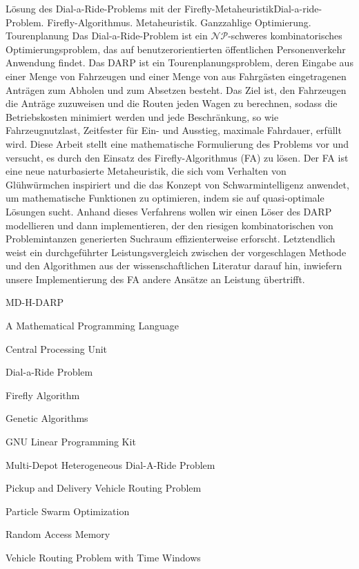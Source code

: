 \documentclass[tuberlin,cic,tc,openright,english,noabntcite,oneside]{iiufrgs}
\begin{document}
\begin{englishabstract}{Lösung des Dial-a-Ride-Problems mit der Firefly-Metaheuristik}{Dial-a-ride-Problem. Firefly-Algorithmus. Metaheuristik. Ganzzahlige Optimierung. Tourenplanung}
Das Dial-a-Ride-Problem ist ein $\mathcal{NP}$-schweres kombinatorisches Optimierungsproblem, das auf benutzerorientierten öffentlichen Personenverkehr Anwendung findet. Das DARP ist ein Tourenplanungsproblem, deren Eingabe aus einer Menge von Fahrzeugen und einer Menge von aus Fahrgästen eingetragenen Anträgen zum Abholen und zum Absetzen besteht. Das Ziel ist, den Fahrzeugen die Anträge zuzuweisen und die Routen jeden Wagen zu berechnen, sodass die Betriebskosten minimiert werden und jede Beschränkung, so wie Fahrzeugnutzlast, Zeitfester für Ein- und Ausstieg, maximale Fahrdauer, erfüllt wird. Diese Arbeit stellt eine mathematische Formulierung des Problems vor und versucht, es durch den Einsatz des Firefly-Algorithmus (FA) zu lösen. Der FA ist eine neue naturbasierte Metaheuristik, die sich vom Verhalten von Glühwürmchen inspiriert und die das Konzept von Schwarmintelligenz anwendet, um mathematische Funktionen zu optimieren, indem sie auf quasi-optimale Lösungen sucht. Anhand dieses Verfahrens wollen wir einen Löser des DARP modellieren und dann implementieren, der den riesigen kombinatorischen von Problemintanzen generierten Suchraum effizienterweise erforscht. Letztendlich weist ein durchgeführter Leistungsvergleich zwischen der vorgeschlagen Methode und den Algorithmen aus der wissenschaftlichen Literatur darauf hin, inwiefern unsere Implementierung des FA andere Ansätze an Leistung übertrifft.
\end{englishabstract}

\listoffigures

\listoftables

\begin{listofabbrv}{MD-H-DARP}
	\item[AMPL] A Mathematical Programming Language
	\item[CPU] Central Processing Unit
    \item[DARP] Dial-a-Ride Problem
    \item[FA] Firefly Algorithm
    \item[GA] Genetic Algorithms
    \item[GLPK] GNU Linear Programming Kit
    \item[MD-H-DARP] Multi-Depot Heterogeneous Dial-A-Ride Problem
    \item[PDVRP] Pickup and Delivery Vehicle Routing Problem
    \item[PSO] Particle Swarm Optimization
    \item[RAM] Random Access Memory
    \item[VRPTW] Vehicle Routing Problem with Time Windows
\end{listofabbrv}
\end{document}
